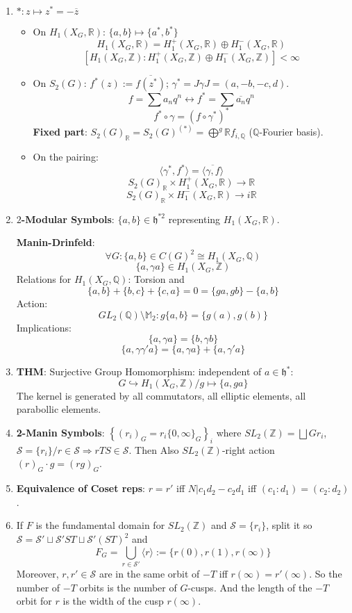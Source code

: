 \documentclass{article}
\newcommand{\Q}{\mathbb{Q}}
\newcommand{\R}{\mathbb{R}}
\newcommand{\Z}{\mathbb{Z}}
\newcommand{\hh}{\mathfrak{h}}
\newcommand{\M}{\mathbb{M}}
\newcommand{\ra}{\rightarrow}
\newcommand{\Ra}{\Rightarrow}
\newcommand{\lra}{\leftrightarrow}
\newcommand{\hra}{\hookrightarrow}
\begin{document}
\begin{multicols}{2}
\begin{enumerate}
\item $*:z \mapsto z^* = -\overline{z}$ 
\begin{itemize}
\item On $H_1(X_G,\R)$: $\{a,b\} \mapsto \{a^*,b^*\}$ 
\[H_1(X_G,\R) = H_1^+(X_G,\R) \oplus H_1^-(X_G,\R)\] 
\[[H_1(X_G,\Z): H_1^+(X_G,\Z) \oplus H_1^-(X_G,\Z)] < \infty\] 
\item On $S_2(G)$: $f^*(z) := \overline{f(z^*)}$; $\gamma^* = J\gamma J = (a,-b,-c,d)$.  
\[f = \sum a_nq^n \lra f^* = \sum \overline{a_n}q^n\]
\[f^* \circ \gamma = (f \circ \gamma^*)^*\]
\textbf{Fixed part}: $S_2(G)_\R = S_2(G)^{(*)} =\bigoplus^g \R f_{i,\Q}$ ($\Q$-Fourier basis). 
\item On the pairing: 
\[\langle \gamma^*, f^* \rangle = \overline{\langle \gamma, f \rangle}\]
\[S_2(G)_\R \times H_1^+(X_G,\R) \ra \R\]
\[S_2(G)_\R \times H_1^-(X_G,\R) \ra i\R\]
\end{itemize}

\item \textbf{$2$-Modular Symbols}: $\{a,b\} \in \hh^{*2}$ representing $H_1(X_G,\R)$. 

\textbf{Manin-Drinfeld}: 
\[\forall G: \{a,b\} \in C(G)^2 \cong H_1(X_G,\Q)\]
\[\{a,\gamma a\} \in H_1(X_G,\Z)\]
Relations for $H_1(X_G,\Q)$: Torsion and 
\[\{a,b\} + \{b,c\} + \{c,a\} = 0 = \{ga,gb\} - \{a,b\}\]
Action:
\[GL_2(\Q)\setminus\M_2: g\{a,b\} = \{g(a),g(b)\}\]
Implications:
\[\{a, \gamma a\} = \{b, \gamma b\}\] 
\[\{a, \gamma \gamma' a\} = \{a,\gamma a\} + \{a,\gamma' a\}\] 

\item \textbf{THM}: Surjective Group Homomorphism: independent of $a \in \hh^*$:
\[G \hra H_1(X_G,\Z)/ g \mapsto \{a,ga\}\]
The kernel is generated by all commutators, all elliptic elements, all parabollic elements.

\item \textbf{2-Manin Symbols}: $\left\{(r_i)_G = r_i\{0,\infty\}_G\right\}_i$ where $SL_2(\Z) = \bigsqcup Gr_i$, $\mathcal{S} = \{r_i\}/r \in \mathcal{S} \Ra rTS \in \mathcal{S}$. Then  Also $SL_2(\Z)$-right action $(r)_G \cdot g =(rg)_G$.

\item \textbf{Equivalence of Coset reps}: $r = r'$ iff $N|c_1d_2-c_2d_1$ iff $(c_1:d_1) = (c_2:d_2)$. 

\item If $F$ is the fundamental domain for $SL_2(\Z)$ and $\mathcal{S}= \{r_i\}$, split it so $\mathcal{S} = \mathcal{S}' \sqcup \mathcal{S}'ST \sqcup \mathcal{S}'(ST)^2$ and 
\[F_G = \bigcup_{r \in \mathcal{S}'} \langle r \rangle := \{r(0), r(1), r(\infty)\}\]
Moreover, $r,r' \in \mathcal{S}$ are in the same orbit of $-T$ iff $r(\infty) = r'(\infty)$. So the number of $-T$ orbits is the number of $G$-cusps. And the length of the $-T$ orbit for $r$ is the width of the cusp $r(\infty)$. \\


\end{enumerate}
\end{multicols}
\end{document}
